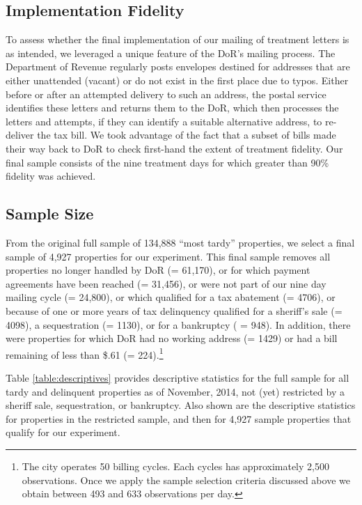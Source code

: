 \documentclass[12pt,titlepage]{article}
\begin{document}
\subsection{Implementation Fidelity}

To assess whether the final implementation of our mailing of treatment
letters is as intended, we leveraged a unique feature of the DoR's
mailing process.  The Department of Revenue regularly posts envelopes
destined for addresses that are either unattended (vacant) or do not
exist in the first place due to typos. Either before or after an
attempted delivery to such an address, the postal service identifies
these letters and returns them to the DoR, which then processes the
letters and attempts, if they can identify a suitable alternative
address, to re-deliver the tax bill. We took advantage of the fact
that a subset of bills made their way back to DoR to check first-hand
the extent of treatment fidelity. Our final sample consists of the
nine treatment days for which greater than 90\% fidelity was achieved.

\subsection{Sample Size}

From the original full sample of 134,888 ``most tardy'' properties, we
select a final sample of 4,927 properties for our experiment.  This
final sample removes all properties no longer handled by DoR (=
61,170), or for which payment agreements have been reached (= 31,456),
or were not part of our nine day mailing cycle (= 24,800), or which
qualified for a tax abatement (= 4706), or because of one or more
years of tax delinquency qualified for a sheriff's sale (= 4098), a
sequestration (= 1130), or for a bankruptcy ( = 948).  In addition,
there were properties for which DoR had no working address (= 1429) or
had a bill remaining of less than \$.61 (= 224).\footnote{The city
  operates 50 billing cycles. Each cycles has approximately 2,500
  observations.  Once we apply the sample selection criteria discussed
  above we obtain between 493 and 633 observations per day.}


Table \ref{table:descriptives} provides descriptive statistics for the full sample 
for all tardy and delinquent properties as of November, 2014, not (yet) 
restricted by a sheriff sale, sequestration, or bankruptcy.   Also shown 
are the descriptive statistics for properties in the restricted sample, 
and then for  4,927 sample properties that qualify for our experiment.
\end{document}
